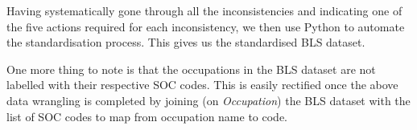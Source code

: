\documentclass[11pt]{article}
\begin{document}
Having systematically gone through all the inconsistencies and indicating one of the five actions required for each inconsistency, we then use Python to automate the standardisation process. This gives us the standardised BLS dataset.

One more thing to note is that the occupations in the BLS dataset are not labelled with their respective SOC codes. This is easily rectified once the above data wrangling is completed by joining (on \emph{Occupation}) the BLS dataset with the list of SOC codes to map from occupation name to code.
\end{document}
